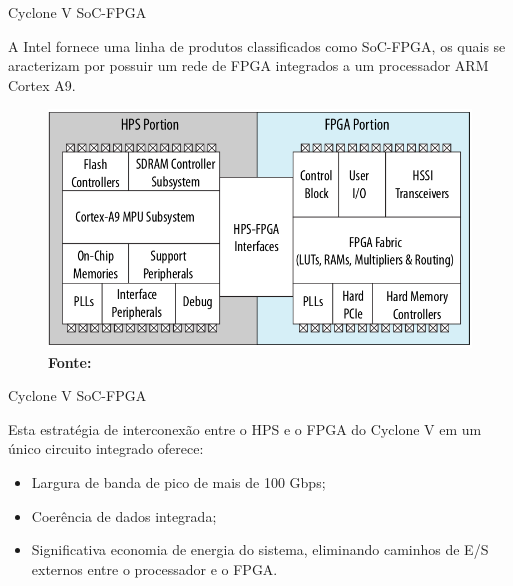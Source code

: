\documentclass[10pt]{beamer}
\begin{document}
\begin{frame}{Cyclone V SoC-FPGA}
		\vspace{0.1cm}
		\begin{justify}
			A Intel fornece uma linha de produtos classificados como SoC-FPGA, os quais se aracterizam por possuir um rede de FPGA integrados a um processador ARM Cortex A9.
		\end{justify}
		\begin{figure}[h]
			\begin{center}
				\includegraphics[scale=0.29]{imagens/socfpga.png}\\
				{\footnotesize \textbf{Fonte:}}
			\end{center}
			\label{fig:SoC}
		\end{figure}
\end{frame}

\begin{frame}{Cyclone V SoC-FPGA}
	\begin{alertblock}{}
		\vspace{0.1cm}
		\begin{justify}
			Esta estratégia de interconexão entre o HPS e o FPGA do Cyclone V em um único
			circuito integrado oferece:
		\end{justify}
		\vspace{0.25cm}
		\begin{itemize}
			\setlength\itemsep{1em}
        	\item Largura de banda de pico de mais de 100 Gbps;
        	\item Coerência de dados integrada;
        	\item Significativa economia de energia do sistema, eliminando caminhos de E/S externos
			entre o processador e o FPGA.
        \end{itemize}
	\end{alertblock}
\end{frame}
\end{document}
